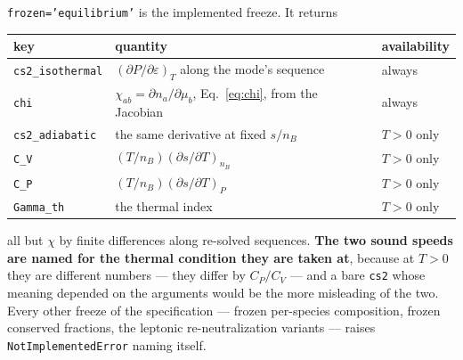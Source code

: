 \documentclass[aps,prc,onecolumn,superscriptaddress,nofootinbib,10pt]{revtex4-2}
\newcommand{\nB}{n_B}
\begin{document}
\texttt{frozen='equilibrium'} is the implemented freeze. It returns
%
\begin{center}
\begin{tabular}{lll}
\toprule
key & quantity & availability \\
\midrule
\texttt{cs2\_isothermal} & $(\partial P/\partial\varepsilon)_T$ along the
                           mode's sequence & always \\
\texttt{chi}             & $\chi_{ab} = \partial n_a/\partial\mu_b$,
                           Eq.~\eqref{eq:chi}, from the Jacobian & always \\
\texttt{cs2\_adiabatic}  & the same derivative at fixed $s/\nB$ & $T > 0$
                           only \\
\texttt{C\_V}            & $(T/\nB)(\partial s/\partial T)_{\nB}$ & $T > 0$
                           only \\
\texttt{C\_P}            & $(T/\nB)(\partial s/\partial T)_{P}$ & $T > 0$
                           only \\
\texttt{Gamma\_th}       & the thermal index & $T > 0$ only \\
\bottomrule
\end{tabular}
\end{center}
%
all but $\chi$ by finite differences along re-solved sequences. \textbf{The two
sound speeds are named for the thermal condition they are taken at}, because
at $T > 0$ they are different numbers --- they differ by $C_P/C_V$ --- and a
bare \texttt{cs2} whose meaning depended on the arguments would be the more
misleading of the two. Every other freeze of the specification --- frozen
per-species composition, frozen conserved fractions, the leptonic
re-neutralization variants --- raises \texttt{NotImplementedError} naming
itself.


\end{document}

